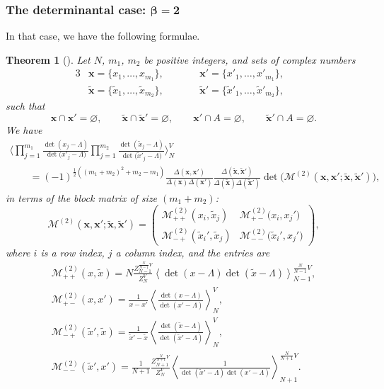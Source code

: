 \documentclass[pdftex]{sigma}
\numberwithin{equation}{section}
\newtheorem{Theorem}{Theorem}[section]
\newcommand{\mean}[1]{\left\langle{#1}\right\rangle}
\begin{document}
\subsubsection[The determinantal case: beta = 2]{The determinantal case: $\boldsymbol{\beta = 2}$}
In that case, we have the following formulae.
\begin{Theorem}[{\cite[Theorem 4.1.1]{borodin_averages}}]
 \label{beta2form} Let $N$, $m_1$, $m_2$ be positive integers, and sets of complex numbers
 \begin{alignat*}{3}
 &\bm{x} = \{x_{1}, \ldots, x_{m_{1}}\},\qquad && \bm{x}' = \bigl\{x'_{1}, \dots, x'_{m_{1}}\bigr\}, &\\
 &\tilde{\bm{x}} = \{\tilde{x}_{1}, \ldots, \tilde{x}_{m_{2}}\},\qquad && \tilde{\bm{x}}' = \bigl\{\tilde{x}'_{1}, \dots, \tilde{x}'_{m_{2}}\bigr\}, &
 \end{alignat*}
 such that
 \begin{equation*}
 \bm{x} \cap \bm{x}' = \varnothing,\qquad\bm{\tilde{x}} \cap \bm{\tilde{x}}'=\varnothing,\qquad\bm{x}' \cap A = \varnothing,\qquad \bm{\tilde{x}}' \cap A = \varnothing.
 \end{equation*}
 We have
 \begin{gather*}%
 \Biggl\langle\prod_{j=1}^{m_{1}} \frac{\det(x_{j} - \Lambda)}{\det\bigl(x'_{j} - \Lambda\bigr)}\prod_{j=1}^{m_{2}}\frac{\det(\tilde{x}_{j} - \Lambda)}{\det\bigl(\tilde{x}'_{j} - \Lambda\bigr)}\Biggr\rangle_{N}^{V}\\
 \qquad  = (-1)^{\frac{1}{2}((m_{1}+m_{2})^{2} + m_{2} - m_{1})}\frac{\Delta(\bm{x}, \bm{x}')}{\Delta(\bm{x})\Delta(\bm{x}')}\frac{\Delta(\tilde{\bm{x}},\tilde{\bm{x}}')}{\Delta(\tilde{\bm{x}})\Delta(\tilde{\bm{x}}')}
 \det\bigl(\mathcal{M}^{(2)}(\bm{x},\bm{x}';\tilde{\bm{x}},\tilde{\bm{x}}')\bigr),
 \end{gather*}
 in terms of the block matrix of size $(m_1 + m_2)$:
 \[
 \mathcal{M}^{(2)}(\bm{x},\bm{x}';\tilde{\bm{x}},\tilde{\bm{x}}') = \begin{pmatrix} \mathcal{M}^{(2)}_{++}(x_i,\tilde{x}_j) & \mathcal{M}^{(2)}_{+-}\big(x_i,x_j'\big) \\ \mathcal{M}_{-+}^{(2)}(\tilde{x}_i',\tilde{x}_j) & \mathcal{M}^{(2)}_{--}\big(\tilde{x}_i',x_j'\big)\end{pmatrix},
 \]
where $i$ is a row index, $j$ a column index, and the entries are
\begin{gather*}%
 \mathcal{M}_{++}^{(2)}(x, \tilde{x}) = N\frac{Z_{N-1}^{\frac{N}{N-1}V}}{Z_{N}^{V}}\mean{\det(x - \Lambda)\det(\tilde{x} - \Lambda)}_{N-1}^{\frac{N}{N-1}V},\\
 \mathcal{M}^{(2)}_{+-}(x, x') = \frac{1}{x-x'}\mean{\frac{\det(x - \Lambda)}{\det(x' - \Lambda)}}_{N}^{V},\\
 \mathcal{M}^{(2)}_{-+}(\tilde{x}',\tilde{x}) = \frac{1}{\tilde{x}' - \tilde{x}}\mean{\frac{\det(\tilde{x} - \Lambda)}{\det(\tilde{x}' - \Lambda)}}_{N}^{V},\\
 \mathcal{M}^{(2)}_{--}(\tilde{x}', x') = \frac{1}{N+1}\frac{Z_{N+1}^{\frac{N}{N+1}V}}{Z_{N}^{V}}\mean{\frac{1}{\det(\tilde{x}' - \Lambda)\det(x' - \Lambda)}}_{N+1}^{\frac{N}{N+1}V}.
 \end{gather*}
\end{Theorem}
\end{document}
